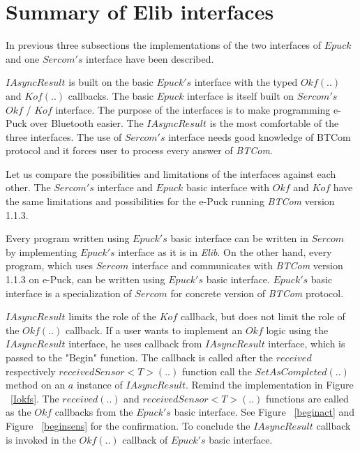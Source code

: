 \documentclass[12pt,notitlepage]{report}
\begin{document}
\section{Summary of Elib interfaces}
\label{sec:suminterface}
	In previous three subsections the implementations of the two interfaces of $Epuck$ 
	and one $Sercom's$ interface have been described.

	$IAsyncResult$ is built on the basic $Epuck's$ interface with the typed $Okf(..)$ and $Kof(..)$ callbacks. 
	The basic $Epuck$ interface is itself built on $Sercom's$ $Okf$ / $Kof$ interface.
	The purpose of the interfaces is to make programming e-Puck over Bluetooth easier.
	The $IAsyncResult$ is the most comfortable of the three interfaces. 
	The use of $Sercom's$ interface needs good knowledge of BTCom protocol and 
	it forces user to process every answer of {\it BTCom}.

	Let us compare the possibilities and limitations of the interfaces against each other.
	The $Sercom's$ interface and $Epuck$ basic interface with $Okf$ and $Kof$ 
	have the same limitations and possibilities for the e-Puck running {\it BTCom} version 1.1.3. 
	
	Every program written using $Epuck's$ basic interface can be written
	in $Sercom$ by implementing $Epuck's$ interface as it is in {\it Elib}.
	On the other hand, every program, which uses $Sercom$ interface and communicates with {\it BTCom}
	version 1.1.3 on e-Puck, can be written using $Epuck's$ basic interface. 
	$Epuck's$ basic interface is a specialization of $Sercom$ for concrete version of {\it BTCom}
	protocol.

	$IAsyncResult$ limits the role of the $Kof$ callback, but does not limit the role of the $Okf(..)$ callback.
	If a user wants to implement an $Okf$ logic using the $IAsyncResult$ interface, he uses callback from $IAsyncResult$
	interface, which is passed to the "Begin" function.
	The callback is called after the $received$ respectively $receivedSensor<T>(..)$ function  call 
	the $SetAsCompleted(..)$ method on an $a$ instance of $IAsyncResult$. 
	Remind the implementation in Figure ~\ref{Iokfs}.
	The $received(..)$ and $receivedSensor<T>(..)$ functions are called as the $Okf$ callbacks
	from the $Epuck's$ basic interface.
	See Figure ~\ref{beginact} and Figure ~\ref{beginsens} for the confirmation.
	To conclude the $IAsyncResult$ callback is invoked in the $Okf(..)$ callback of $Epuck's$ basic interface.
\end{document}

